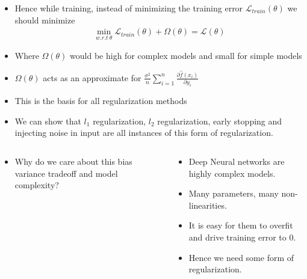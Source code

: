 \begin{frame}
	\begin{itemize}
		\justifying
		\setlength\itemsep{1em}
		\item<1->Hence while training, instead of minimizing the training error $\mathscr{L}_{train}(\theta)$ we should minimize
		\begin{align*}
			\min\limits_{w.r.t\ \theta} \mathscr{L}_{train}(\theta) + \Omega(\theta) = \mathscr{L}(\theta)
		\end{align*}
		\item<2->Where $\Omega(\theta)$ would be high for complex models and small for simple models
		\item<3->$\Omega(\theta)$ acts as an approximate for $\frac{\sigma^2}{n}\sum_{i=1}^{n}\frac{\partial\hat{f}(x_i)}{\partial y_i}$
		\item<4->This is the basis for all regularization methods
		\item<5->We can show that $l_1$ regularization, $l_2$ regularization, early stopping and injecting noise in input are all instances of this form of regularization.
	\end{itemize}
\end{frame}
\begin{frame}
	\centering
	
\end{frame}
		
\begin{frame}
	\begin{columns}
		\begin{overlayarea}{\textwidth}{\textheight}
			\justifying
			\begin{itemize}
				\item<1-> Why do we care about this bias variance tradeoff and model complexity?
			\end{itemize}

		\end{overlayarea}
		\begin{overlayarea}{\textwidth}{\textheight}
			\begin{itemize}
				\justifying
				\item<2->  Deep Neural networks are highly complex models.
				\item <3-> Many parameters, many non-linearities.
				\item <4-> It is easy for them to overfit and drive training error to 0.
				      \item<5->  Hence we need some form of regularization.
			\end{itemize}
		\end{overlayarea}
	\end{columns}
\end{frame}
		
